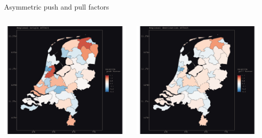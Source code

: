 \documentclass{beamer}
\begin{document}
\begin{frame}{Asymmetric push and pull factors}
		\begin{columns}
	\begin{column}{0.5\textwidth}
		\begin{center}
			\includegraphics[width=1.1\textwidth]{../../fig/p_coef_out}      
		\end{center}
	\end{column}
	\begin{column}{0.5\textwidth} 	
		\begin{center}
			\includegraphics[width=1.1\textwidth]{../../fig/p_coef_in}      
		\end{center}
	\end{column}
\end{columns}
\end{frame}
\end{document}
